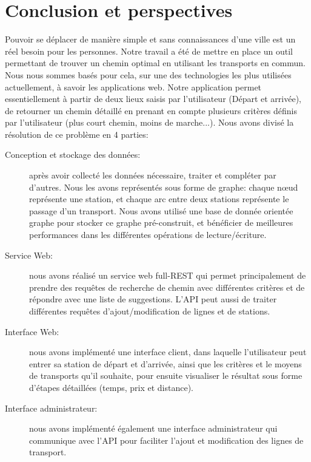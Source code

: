\chapter{Conclusion et perspectives}

Pouvoir se déplacer de manière simple et sans connaissances d'une ville est un réel besoin pour les personnes. Notre travail a été de mettre en place un outil permettant de trouver un chemin optimal en utilisant les transports en commun.
Nous nous sommes basés pour cela, sur une des technologies les plus utilisées actuellement, à savoir les applications web.\newline
Notre application permet essentiellement à partir de deux lieux saisis par l'utilisateur (Départ et arrivée), de retourner un chemin détaillé en prenant en compte plusieurs critères définis par l'utilisateur (plus court chemin, moins de marche...).\newline
Nous avons divisé la résolution de ce problème en 4 parties:

\begin{description}
\item[Conception et stockage des données:] après avoir collecté les données nécessaire, traiter et compléter par d'autres. Nous les avons représentés sous forme de graphe: chaque nœud représente une station, et chaque arc entre deux stations représente le passage d'un transport.\newline
Nous avons utilisé une base de donnée orientée graphe pour stocker ce graphe pré-construit, et bénéficier de meilleures performances dans les différentes opérations de lecture/écriture.
\item[Service Web:] nous avons réalisé un service web full-REST qui permet principalement de prendre des requêtes de recherche de chemin avec différentes critères et de répondre avec une liste de suggestions. L'API peut aussi de traiter différentes requêtes d'ajout/modification de lignes et de stations.
\item[Interface Web:]  nous avons implémenté une interface client, dans laquelle l'utilisateur peut entrer sa station de départ et d'arrivée, ainsi que les critères et le moyens de transports qu'il souhaite, pour ensuite visualiser le résultat sous forme d'étapes détaillées (temps, prix et distance).

\item[Interface administrateur:] nous avons implémenté également une interface administrateur qui communique avec l'API pour faciliter l'ajout et modification des lignes de transport.

\end{description}


